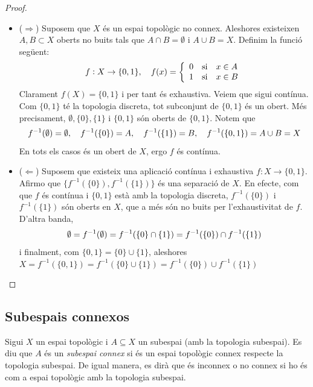 \documentclass[../main.tex]{subfiles}
\begin{document}
\begin{proof}
\begin{itemize}
    \item ($\Rightarrow$) Suposem que $X$ és un espai topològic no connex. Aleshores existeixen $A,B\subset X$ oberts no buits tals que $A\cap B = \emptyset$ i $A\cup B =X$. Definim la funció següent:
    \begin{equation}
        \notag
        f:X\rightarrow \{0,1\},\quad f(x) = \left\{
        \begin{array}{lll}
            0 & \text{si} & x\in A\\
            1 & \text{si} & x\in B
        \end{array}
        \right.
    \end{equation}
    Clarament $f(X) = \{0,1\}$ i per tant és exhaustiva. Veiem que sigui contínua. Com $\{0,1\}$ té la topologia discreta, tot subconjunt de $\{0,1\}$ és un obert. Més precisament, $\emptyset,\{0\},\{1\}$ i $\{0,1\}$ són oberts de $\{0,1\}$. Notem que
    \begin{equation}
        \notag
        f^{-1}(\emptyset) = \emptyset,\quad f^{-1}(\{0\}) = A,\quad f^{-1}(\{1\}) = B,\quad f^{-1}(\{0,1\}) = A\cup B = X
    \end{equation}
    En tots els casos és un obert de $X$, ergo $f$ és contínua.
    
    \item ($\Leftarrow$) Suposem que existeix una aplicació contínua i exhaustiva $f:X\rightarrow \{0,1\}$. Afirmo que $\{f^{-1}(\{0\}),f^{-1}(\{1\})\}$ és una separació de $X$. En efecte, com que $f$ és contínua i $\{0,1\}$ està amb la topologia discreta, $f^{-1}(\{0\})$ i $f^{-1}(\{1\})$ són oberts en $X$, que a més són no buits per l'exhaustivitat de $f$. D'altra banda, 
    \begin{equation}
        \notag
        \emptyset = f^{-1}(\emptyset) = f^{-1}(\{0\}\cap\{1\}) = f^{-1}(\{0\})\cap f^{-1}(\{1\})
    \end{equation}
    i finalment, com $\{0,1\} = \{0\}\cup\{1\}$, aleshores $X = f^{-1}(\{0,1\}) = f^{-1}(\{0\}\cup\{1\}) = f^{-1}(\{0\})\cup f^{-1}(\{1\})$
\end{itemize}
\end{proof}

\subsection{Subespais connexos}

\begin{defi}
\label{def:subespaiconnex} Sigui $X$ un espai topològic i $A\subseteq X$ un subespai (amb la topologia subespai). Es diu que $A$ és un \textit{subespai connex} si és un espai topològic connex respecte la topologia subespai. De igual manera, es dirà que és inconnex o no connex si ho és com a espai topològic amb la topologia subespai.
\end{defi}
\end{document}
